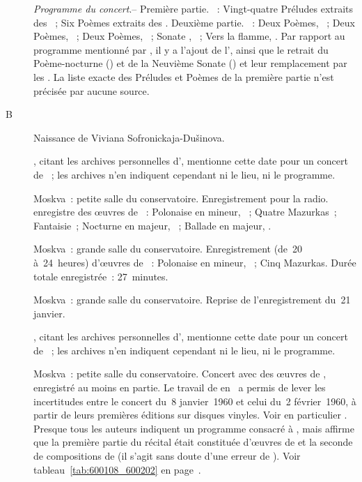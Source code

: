 \begin{description}
 \emph{Programme du concert}.--
 Première partie.
 \textsc{\Scriabine{}}~: Vingt-quatre Préludes extraits des ~; Six Poèmes extraits des .
 Deuxième partie.
 \textsc{\Scriabine{}}~: Deux Poèmes, ~; Deux Poèmes, ~;
 Deux Poèmes, ~; Sonate , ~; Vers la flamme,
 .
 Par rapport au programme mentionné par \citet[p.~182]{Nekrasova08}, il y a
 l'ajout de l', ainsi que le retrait du Poème-nocturne ()
 et de la Neuvième Sonate () et leur remplacement par les .
 La liste exacte des Préludes et Poèmes de la première partie n'est précisée
 par aucune source.
 \item[B\DateWithWeekDay{1960-01-13}]
 Naissance de Viviana Sofronickaja-Dušinova.
 \item[\DateWithWeekDay{1960-01-13}]
 \citet[p.~183]{Nekrasova08}, citant les archives personnelles d'\AVizel{},
 mentionne cette date pour un concert de \VSofronitsky{}~; les archives n'en
 indiquent cependant ni le lieu, ni le programme.
 \item[\DateWithWeekDay{1960-01-14}]
 Moskva~: petite salle du conservatoire.
 Enregistrement pour la radio.
 \VSofronitsky{} enregistre des œuvres de \Chopin{}~: Polonaise en \kC
 \Sharp mineur,  ~; Quatre Mazurkas~; Fantaisie~;
 Nocturne  en \kD \Flat majeur,  ~; Ballade
  en \kA \Flat majeur, .
 \item[\DateWithWeekDay{1960-01-21}]
 Moskva~: grande salle du conservatoire.
 Enregistrement (de~20 à~24~heures) d'œuvres de \Chopin{}~: Polonaise en \kC
 \Sharp mineur,  ~; Cinq Mazurkas.
 Durée totale enregistrée~: 27~minutes.
 \item[\DateWithWeekDay{1960-01-25}]
 Moskva~: grande salle du conservatoire.
 Reprise de l'enregistrement du~21 janvier.
 \item[\DateWithWeekDay{1960-01-28}]
 \citet[p.~183]{Nekrasova08}, citant les archives personnelles d'\AVizel{},
 mentionne cette date pour un concert de \VSofronitsky{}~; les archives n'en
 indiquent cependant ni le lieu, ni le programme.
 \item[\DateWithWeekDay{1960-02-02}]
 Moskva~: petite salle du conservatoire.
 Concert avec des œuvres de \Scriabine{}, enregistré au moins en partie.
 Le travail de \citeauthor{Malik} en~\citeyear{Malik} a permis de lever les
 incertitudes entre le concert du~8 janvier~1960 et celui du~2 février~1960,
 à partir de leurs premières éditions sur disques vinyles.
 Voir en particulier \citet[p.~447]{Milshteyn82a}.
 Presque tous les auteurs indiquent un programme consacré à \Scriabine{},
 mais \citet[p.~183]{Nekrasova08} affirme que la première partie du récital
 était constituée d'œuvres de \Chopin{} et la seconde de compositions de
 \Scriabine{} (il s'agit sans doute d'une erreur de
 \citeauthor{Nekrasova08}).
 Voir tableau~\ref{tab:600108_600202} en page~\pageref{tab:600108_600202}.


\end{description}
